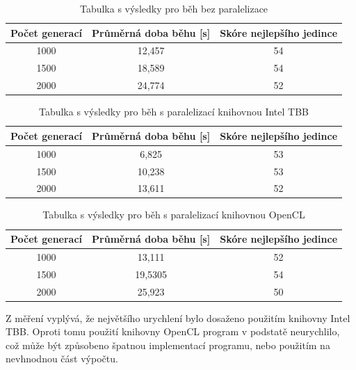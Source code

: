 \documentclass[11pt,a4paper]{scrartcl}
\begin{document}
	\begin{table}[H]
		\begin{center}
			\begin{tabular}{|c|c|c|}
				\hline
				Počet generací & Průměrná doba běhu [s] & Skóre nejlepšího jedince\\
				\hline
				\hline
				1000 & 12,457 & 54 \\
				\hline
				1500 & 18,589 & 54 \\
				\hline
				2000 & 24,774 & 52 \\
				\hline
			\end{tabular}
		\end{center}
		\caption{Tabulka s výsledky pro běh bez paralelizace}
		\label{tab:res-serial}
	\end{table}

	\begin{table}[H]
		\begin{center}
			\begin{tabular}{|c|c|c|}
				\hline
				Počet generací & Průměrná doba běhu [s] & Skóre nejlepšího jedince\\
				\hline
				\hline
				1000 & 6,825 & 53 \\
				\hline
				1500 & 10,238 & 53 \\
				\hline
				2000 & 13,611 & 52 \\
				\hline
			\end{tabular}
		\end{center}
		\caption{Tabulka s výsledky pro běh s paralelizací knihovnou Intel TBB}
		\label{tab:res-tbb}
	\end{table}

	\begin{table}[H]
		\begin{center}
			\begin{tabular}{|c|c|c|}
				\hline
				Počet generací & Průměrná doba běhu [s] & Skóre nejlepšího jedince\\
				\hline
				\hline
				1000 & 13,111 & 52 \\
				\hline
				1500 & 19,5305 & 54 \\
				\hline
				2000 & 25,923 & 50 \\
				\hline
			\end{tabular}
		\end{center}
		\caption{Tabulka s výsledky pro běh s paralelizací knihovnou OpenCL}
		\label{tab:res-opencl}
	\end{table}

	Z měření vyplývá, že největšího urychlení bylo dosaženo použitím knihovny Intel TBB. Oproti tomu použití knihovny OpenCL program v podstatě neurychlilo, což může být způsobeno špatnou implementací programu, nebo použitím na nevhnodnou část výpočtu.
\end{document}
